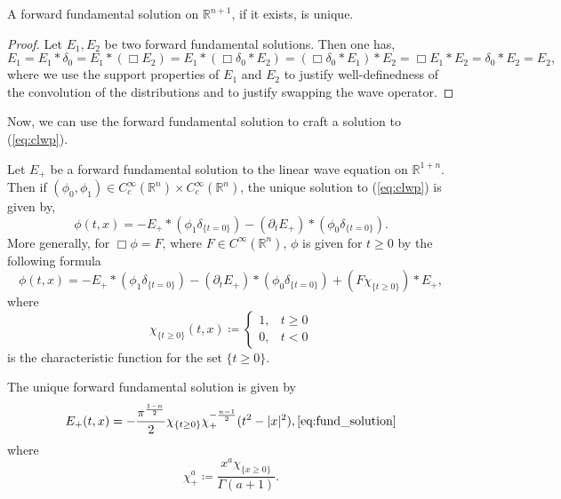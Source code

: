 \documentclass{article}
\begin{document}
\begin{prop}
	A forward fundamental solution on $\mathbb{R}^{n + 1}$, if it exists, is unique. 
\end{prop} 
\begin{proof}
	Let $E_{1}, E_{2}$ be two forward fundamental solutions. Then one has, 
	\begin{equation*}
		E_{1} = E_{1} \ast \delta_{0}  = E_{1} \ast (\Box E_{2}) = E_{1} \ast (\Box \delta_{0} \ast E_{2}) = (\Box \delta_{0} \ast E_{1}) \ast E_{2} = \Box E_{1} \ast E_{2} = \delta_{0} \ast E_{2} = E_{2}, 
	\end{equation*}
	where we use the support properties of $E_{1}$ and $E_{2}$ to justify well-definedness of the convolution of the distributions and to justify swapping the wave operator.  
\end{proof} 

Now, we can use the forward fundamental solution to craft a solution to (\ref{eq:clwp}). 

\begin{prop}
	Let $E_{+}$ be a forward fundamental solution to the linear wave equation on $\mathbb{R}^{1 + n}$. Then if $(\phi_{0}, \phi_{1}) \in C_{c}^{\infty}(\mathbb{R}^{n}) \times C_{c}^{\infty}(\mathbb{R}^{n})$, the unique solution to (\ref{eq:clwp}) is given by, 
	\begin{equation*}
			\phi(t, x) = -E_{+} \ast (\phi_{1}\delta_{\{t = 0\}}) - (\partial_{t}E_{+}) \ast (\phi_{0}\delta_{\{t = 0\}}). 
	\end{equation*}
	More generally, for $\Box \phi = F$, where $F \in C^{\infty}(\mathbb{R}^{n})$, $\phi$ is given for $t \geq 0$ by the following formula 
	\begin{equation*}
		\phi(t, x) = -E_{+} \ast (\phi_{1}\delta_{\{t = 0\}}) - (\partial_{t}E_{+}) \ast (\phi_{0}\delta_{\{t = 0\}}) + (F\chi_{\{t\geq 0\}}) \ast E_{+}, 
	\end{equation*}
	where 
	\begin{equation*}
		\chi_{\{t \geq 0\}}(t, x) \coloneqq 
		\begin{cases}
			1, & t \geq 0 \\
			0, & t < 0
		\end{cases}
	\end{equation*}
	is the characteristic function for the set $\{t \geq 0\}$. 
\end{prop} 

\begin{prop}
	The unique forward fundamental solution is given by 
	\begin{equation}
		E_{+}(t, x) = -\frac{\pi^{\frac{1 - n}{2}}}{2}\chi_{\{t \geq 0\}}\chi_{+}^{-\frac{n-1}{2}}(t^{2} - |x|^{2}), 
		\ref{eq:fund_solution} 
	\end{equation}
	where 
	\begin{equation*}
		\chi_{+}^{a} \coloneqq \frac{x^{a}\chi_{\{x \geq 0\}}}{\Gamma(a + 1)}. 
	\end{equation*}
\end{prop} 
\end{document}

